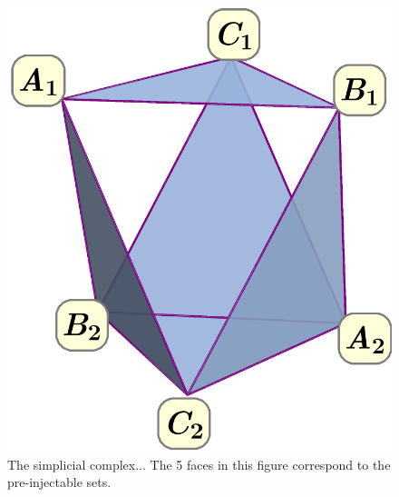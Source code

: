 \begin{figure}[t]
\begin{minipage}[b]{0.3\linewidth}
\includegraphics[scale=0.2]{simplicialcomplex.pdf}
\caption{The simplicial complex... The 5 faces in this figure correspond to the pre-injectable sets.}\label{fig:simplicialcomplex222}
\end{minipage}
\end{figure}

